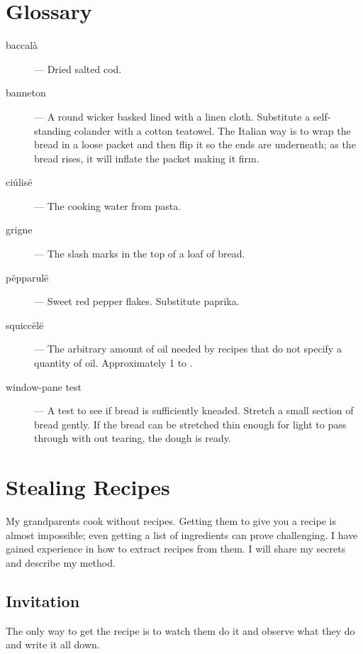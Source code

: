 
\mainmatter



\backmatter

\chapter{Glossary}
\begin{description}
\item[baccalà]  --- Dried salted cod.
\item[banneton] --- A round wicker basked lined with a linen cloth. Substitute a self-standing colander with a cotton teatowel. The Italian way is to wrap the bread in a loose packet and then flip it so the ends are underneath; as the bread rises, it will inflate the packet making it firm.
\item[ciúlisë]  --- The cooking water from pasta.
\item[grigne]  --- The slash marks in the top of a loaf of bread.
\item[pëpparulë]  --- Sweet red pepper flakes. Substitute paprika.
\item[squiccëlë]  --- The arbitrary amount of oil needed by recipes that do not specify a quantity of oil. Approximately 1 to .
\item[window-pane test] --- A test to see if bread is sufficiently kneaded. Stretch a small section of bread gently. If the bread can be stretched thin enough for light to pass through with out tearing, the dough is ready.
\end{description}

\printindex

\appendix
\chapter{Stealing Recipes}
My grandparents cook without recipes. Getting them to give you a recipe is almost impossible; even getting a list of ingredients can prove challenging. I have gained experience in how to extract recipes from them. I will share my secrets and describe my method.

\section{Invitation}
The only way to get the recipe is to watch them do it and observe what they do and write it all down.

